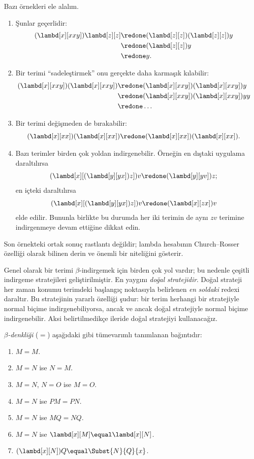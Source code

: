 \documentclass[../../../include/open-logic-section]{subfiles}
\begin{document}
Bazı örnekleri ele alalım.
\begin{enumerate}
\item Şunlar geçerlidir:
\begin{align*}
(\lambd[x][xxy]) \lambd[z][z] & \redone (\lambd[z][z])(\lambd[z][z]) y \\
& \redone (\lambd[z][z]) y \\
& \redone y.
\end{align*}
\item Bir terimi ``sadeleştirmek'' onu gerçekte daha karmaşık kılabilir:
\begin{align*}
(\lambd[x][xxy])(\lambd[x][xxy]) & \redone (\lambd[x][xxy])(\lambd[x][xxy])y \\
& \redone (\lambd[x][xxy])(\lambd[x][xxy])yy \\
& \redone \dots
\end{align*}
\item Bir terimi değişmeden de bırakabilir:
\[
(\lambd[x][xx])(\lambd[x][xx]) \redone (\lambd[x][xx])(\lambd[x][xx]).
\]
\item Bazı terimler birden çok yoldan indirgenebilir. Örneğin en dıştaki
uygulama daraltılırsa
\[
(\lambd[x][(\lambd[y][yx]) z]) v \redone (\lambd[y][yv]) z;
\]
en içteki daraltılırsa
\[
(\lambd[x][(\lambd[y][yx]) z]) v \redone (\lambd[x][zx]) v
\]
elde edilir. Bununla birlikte bu durumda her iki terimin de aynı $zv$
terimine indirgenmeye devam ettiğine dikkat edin.
\end{enumerate}

Son örnekteki ortak sonuç rastlantı değildir; lambda hesabının
Church--Rosser özelliği olarak bilinen derin ve önemli bir niteliğini gösterir.

\begin{digress}
  Genel olarak bir terimi $\beta$-indirgemek için birden çok yol vardır; bu
  nedenle çeşitli indirgeme stratejileri geliştirilmiştir. En yaygını
  \emph{doğal stratejidir}. Doğal strateji her zaman konumu terimdeki başlangıç
  noktasıyla belirlenen \emph{en soldaki} redexi daraltır. Bu stratejinin
  yararlı özelliği şudur: bir terim herhangi bir stratejiyle normal biçime
  indirgenebiliyorsa, ancak ve ancak doğal stratejiyle normal biçime
  indirgenebilir. Aksi belirtilmedikçe ileride doğal stratejiyi kullanacağız.
\end{digress}

\begin{defn}
  \emph{$\beta$-denkliği} ($\equal$) aşağıdaki gibi tümevarımlı tanımlanan
  bağıntıdır:
  \begin{enumerate}
  \item $M \equal M$.
  \item $M \equal N$ ise $N \equal M$.
  \item $M \equal N$, $N \equal O$ ise $M \equal O$.
  \item $M \equal N$ ise $PM \equal PN$.
  \item $M \equal N$ ise $MQ \equal NQ$.
  \item $M \equal N$ ise $\lambd[x][M] \equal \lambd[x][N]$.
  \item $(\lambd[x][N])Q \equal \Subst{N}{Q}{x}$.
  \end{enumerate}
\end{defn}
\end{document}
